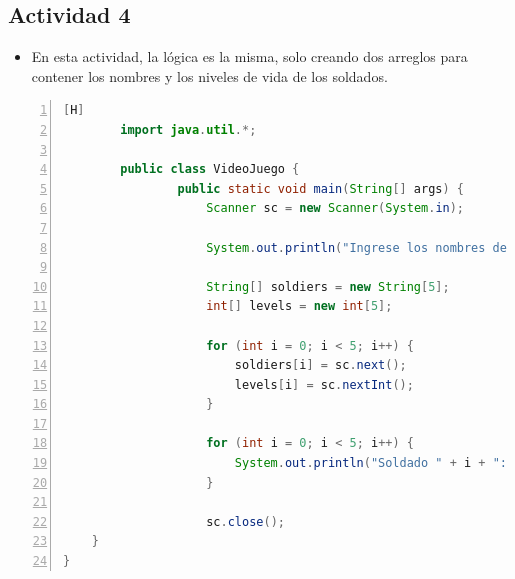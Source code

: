 \documentclass{article}
\begin{document}
	\subsection{Actividad 4}
	\begin{itemize}
		\item En esta actividad, la lógica es la misma, solo creando dos arreglos para contener los nombres y los niveles de vida de los soldados. 
	\end{itemize}
	\begin{lstlisting}[language=java,caption={Usando arreglos para los niveles de vida y nombres}, numbers=left][H]
		import java.util.*;

		public class VideoJuego {
    			public static void main(String[] args) {
        			Scanner sc = new Scanner(System.in);

        			System.out.println("Ingrese los nombres de los soldados y sus respectivos niveles de vida");

        			String[] soldiers = new String[5];
        			int[] levels = new int[5];

        			for (int i = 0; i < 5; i++) {
            			soldiers[i] = sc.next();
            			levels[i] = sc.nextInt();
        			}

        			for (int i = 0; i < 5; i++) {
            			System.out.println("Soldado " + i + ": " + soldiers[i] + " y su nivel de vida es: " + levels[i]);
        			}

        			sc.close();
    }
}
	\end{lstlisting}
\end{document}
